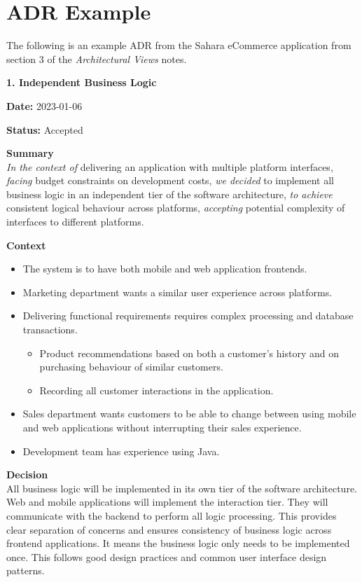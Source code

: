 \section{ADR Example}
The following is an example ADR from the Sahara eCommerce application from section 3 of the \textit{Architectural Views} notes.
\newline

\noindent\textbf{1. Independent Business Logic}

\noindent\textbf{Date:} 2023-01-06

\noindent\textbf{Status:} Accepted

\noindent\textbf{Summary}\\
\emph{In the context of} delivering an application with multiple platform interfaces,  
\emph{facing} budget constraints on development costs,  
\emph{we decided} to implement all business logic in an independent tier of the software architecture,  
\emph{to achieve} consistent logical behaviour across platforms,  
\emph{accepting} potential complexity of interfaces to different platforms.

\noindent\textbf{Context}
\begin{itemize}[topsep=0pt,noitemsep]
    \item The system is to have both mobile and web application frontends.
    \item Marketing department wants a similar user experience across platforms.
    \item Delivering functional requirements requires complex processing and database transactions.
    \begin{itemize}[topsep=0pt,noitemsep]
        \item Product recommendations based on both a customer's history and on purchasing behaviour of similar customers.
        \item Recording all customer interactions in the application.
    \end{itemize}
    \item Sales department wants customers to be able to change between using mobile and web applications without interrupting their sales experience.
    \item Development team has experience using Java.
\end{itemize}

\noindent\textbf{Decision}\\
All business logic will be implemented in its own tier of the software architecture.
Web and mobile applications will implement the interaction tier.
They will communicate with the backend to perform all logic processing.
This provides clear separation of concerns and ensures consistency of business logic across frontend applications.
It means the business logic only needs to be implemented once.
This follows good design practices and common user interface design patterns.

